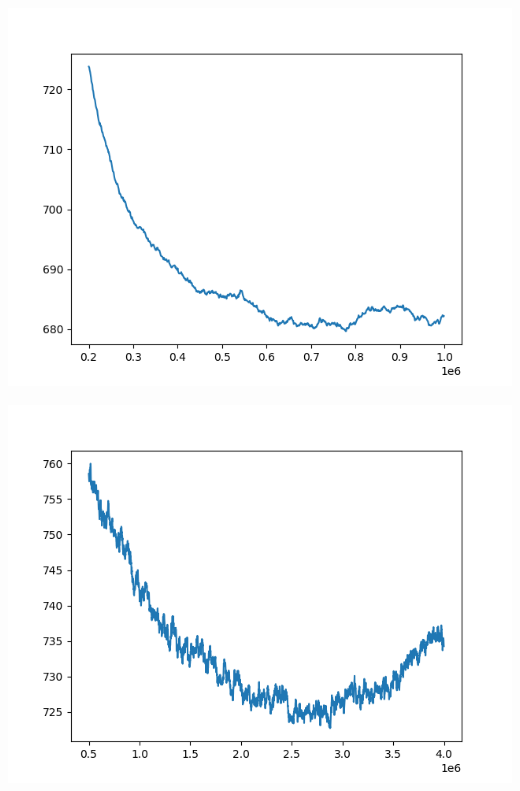 \documentclass{article}
\begin{document}
\begin{enumerate}[label=\arabic*.]
\begin{minipage}{0.49\linewidth}
            \includegraphics[width=\linewidth]{../starter_code/figs/sgd_wo_k_70.png}
        \end{minipage}\hfill
        \begin{minipage}{0.49\linewidth}
            \includegraphics[width=\linewidth]{../starter_code/figs/sgd_k70.png}
        \end{minipage}\hfill
        \begin{minipage}{0.49\linewidth}

\end{minipage}
\end{enumerate}
\end{document}

